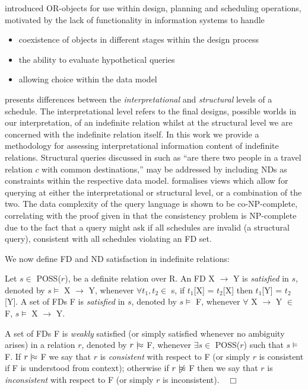 \cite{inv91} introduced OR-objects for use within design, planning and
scheduling operations, motivated by the lack of functionality in
information systems to handle
\begin{itemize}
\item coexistence of objects in different stages within the design
process
\item the ability to evaluate hypothetical queries
\item allowing choice within the data model
\end{itemize}

\cite{inv91} presents differences between the {\em interpretational} and
{\em structural} levels of a schedule. The interpretational level refers to
the final designs, possible worlds in our interpretation, of an
indefinite relation whilst at the structural level we are concerned with
the indefinite relation itself. In this work we provide a methodology
for assessing interpretational information content of indefinite
relations. Structural queries discussed in
\cite{iv89,inv91} such as ``are there two people in a travel relation $c$
with common destinations,'' may be addressed by including NDs as
constraints within the respective data model.  \cite{inv91} formalises
views which allow for querying at either the interpretational or
structural level, or a combination of the two. The data complexity of
the query language is shown to be co-NP-complete, correlating with the
proof given in \cite{vn95} that the consistency problem is NP-complete
due to the fact that a query might ask if all schedules are invalid (a
structural query), consistent with all schedules violating an FD set.

\medskip

We now define FD and ND satisfaction in indefinite relations:
\begin{definition}\label{def:sat-indef}
\begin{rm}
Let $s \in$ POSS($r$), be a definite relation over R.
An FD X $\to$ Y is {\em satisfied} in $s$,
denoted by $s \models$ X $\to$ Y, whenever
$\forall t_1, t_2 \in$ s, if $t_1$[X] = $t_2$[X] then $t_1$[Y] = $t_2$[Y].
A set of FDs F is {\em satisfied} in $s$,
denoted by $s \models$ F, whenever
$\forall$ X $\to$ Y $\in$ F, $s \models$ X $\to$ Y.

\smallskip
{}
A set of FDs F is {\em weakly} satisfied  
(or simply satisfied whenever no ambiguity arises) in a relation $r$,
denoted by $r \mid\!\approx$ F, whenever 
$\exists s \in$ POSS($r$) such that $s \models$ F.
If $r \mid\!\approx$ F we say that $r$ is {\em consistent} with respect to F 
(or simply $r$ is consistent if F is understood from context);
otherwise if $r \mid\!\not\approx$ F then we say that $r$ is {\em inconsistent}
with respect to F (or simply $r$ is inconsistent).$\quad\Box$
\end{rm}
\end{definition}

